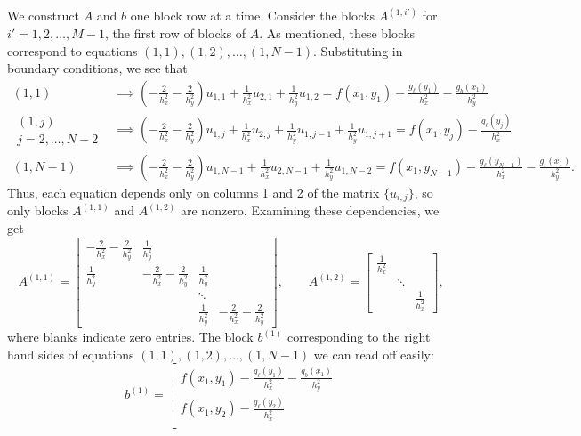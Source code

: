 \documentclass{homework}
\begin{document}
\begin{alphaparts}
		We construct $A$ and $b$ one block row at a time. Consider the blocks $A^{(1,i')}$ for $i'=1,2,\dots, M-1$, the first row of blocks of $A$. As mentioned, these blocks correspond to equations $(1,1),(1,2), \dots, (1,N-1)$. Substituting in boundary conditions, we see that
		\begin{align*}
			(1,1) &\implies \left(-\frac{2}{h_x^2}-\frac{2}{h_y^2}\right)u_{1,1} + \frac{1}{h_x^2}u_{2,1} + \frac{1}{h_y^2}u_{1,2} = f(x_1,y_1) - \frac{g_\ell(y_1)}{h_x^2} - \frac{g_b(x_1)}{h_y^2} \\
			\substack{(1,j) \\ j=2,\dots,N-2} &\implies \left(-\frac{2}{h_x^2}-\frac{2}{h_y^2}\right)u_{1,j} + \frac{1}{h_x^2}u_{2,j} + \frac{1}{h_y^2}u_{1,j-1} + \frac{1}{h_y^2}u_{1,j+1} = f(x_1,y_j) - \frac{g_\ell(y_j)}{h_x^2}\\
			(1,N-1) &\implies \left(-\frac{2}{h_x^2}-\frac{2}{h_y^2}\right)u_{1,N-1} + \frac{1}{h_x^2}u_{2,N-1} + \frac{1}{h_y^2}u_{1,N-2} = f(x_1, y_{N-1}) - \frac{g_\ell(y_{N-1})}{h_x^2} - \frac{g_t(x_1)}{h_y^2}.
		\end{align*}
		Thus, each equation depends only on columns 1 and 2 of the matrix $\{u_{i,j}\}$, so only blocks $A^{(1,1)}$ and $A^{(1,2)}$ are nonzero. Examining these dependencies, we get
		\begin{equation*}
			A^{(1,1)} = \left[\begin{matrix}
				-\frac{2}{h_x^2}-\frac{2}{h_y^2} & \frac{1}{h_y^2} \\
				\frac{1}{h_y^2} & -\frac{2}{h_x^2}-\frac{2}{h_y^2} & \frac{1}{h_y^2} \\
				& & \ddots \\
				& & \frac{1}{h_y^2} & -\frac{2}{h_x^2}-\frac{2}{h_y^2} 
			\end{matrix}\right], \qquad
			A^{(1,2)} = \left[\begin{matrix}\frac{1}{h_x^2} \\ & \ddots \\ & & \frac{1}{h_x^2} \end{matrix}\right],
		\end{equation*}
		where blanks indicate zero entries. The block $b^{(1)}$ corresponding to the right hand sides of equations $(1,1),(1,2), \dots, (1,N-1)$ we can read off easily:
		\begin{equation*}
			b^{(1)} = \left[\begin{matrix}
				f(x_1,y_1) - \frac{g_\ell(y_1)}{h_x^2} - \frac{g_b(x_1)}{h_y^2} \\
				f(x_1,y_2) - \frac{g_\ell(y_2)}{h_x^2} \\

\end{matrix}
\end{equation*}
\end{alphaparts}
\end{document}
